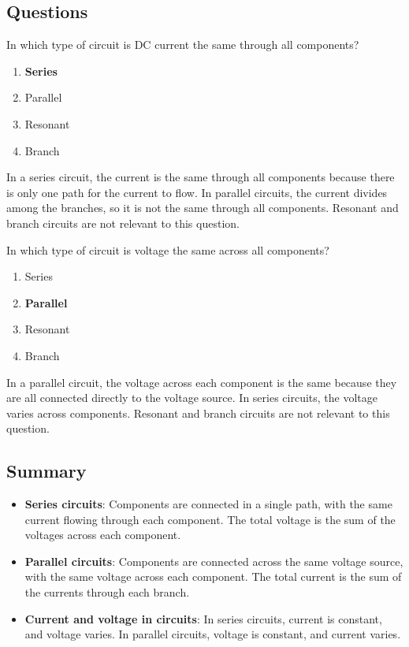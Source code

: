 \subsection*{Questions}
\begin{tcolorbox}[colback=gray!10!white,colframe=black!75!black,title={T5D13}]
    In which type of circuit is DC current the same through all components?
    \begin{enumerate}[label=\Alph*,noitemsep]
        \item \textbf{Series}
        \item Parallel
        \item Resonant
        \item Branch
    \end{enumerate}
\end{tcolorbox}
In a series circuit, the current is the same through all components because there is only one path for the current to flow. In parallel circuits, the current divides among the branches, so it is not the same through all components. Resonant and branch circuits are not relevant to this question.


\begin{tcolorbox}[colback=gray!10!white,colframe=black!75!black,title={T5D14}]
    In which type of circuit is voltage the same across all components?
    \begin{enumerate}[label=\Alph*,noitemsep]
        \item Series
        \item \textbf{Parallel}
        \item Resonant
        \item Branch
    \end{enumerate}
\end{tcolorbox}
In a parallel circuit, the voltage across each component is the same because they are all connected directly to the voltage source. In series circuits, the voltage varies across components. Resonant and branch circuits are not relevant to this question.


\subsection*{Summary}
\begin{itemize}
    \item \textbf{Series circuits}: Components are connected in a single path, with the same current flowing through each component. The total voltage is the sum of the voltages across each component.
    \item \textbf{Parallel circuits}: Components are connected across the same voltage source, with the same voltage across each component. The total current is the sum of the currents through each branch.
    \item \textbf{Current and voltage in circuits}: In series circuits, current is constant, and voltage varies. In parallel circuits, voltage is constant, and current varies.
\end{itemize}
